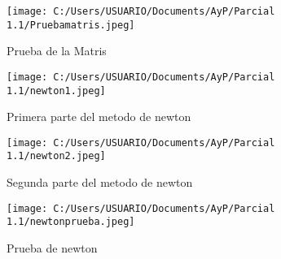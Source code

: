 \documentclass[journal]{IEEEtran}
\begin{document}
\begin{figure}[h!]
\centering
\texttt{[image: C:/Users/USUARIO/Documents/AyP/Parcial 1.1/Pruebamatris.jpeg]}
\caption{Prueba de la Matris}
\label{figure_sim}
\end{figure}


\begin{figure}[h!]
\centering
\texttt{[image: C:/Users/USUARIO/Documents/AyP/Parcial 1.1/newton1.jpeg]}
\caption{Primera parte del metodo de newton}
\label{figure_sim}
\end{figure}

\begin{figure}[h!]
\centering
\texttt{[image: C:/Users/USUARIO/Documents/AyP/Parcial 1.1/newton2.jpeg]}
\caption{Segunda parte del metodo de newton}
\label{figure_sim}
\end{figure}


\begin{figure}[h!]
\centering
\texttt{[image: C:/Users/USUARIO/Documents/AyP/Parcial 1.1/newtonprueba.jpeg]}
\caption{Prueba de newton}
\label{figure_sim}
\end{figure}
\end{document}
